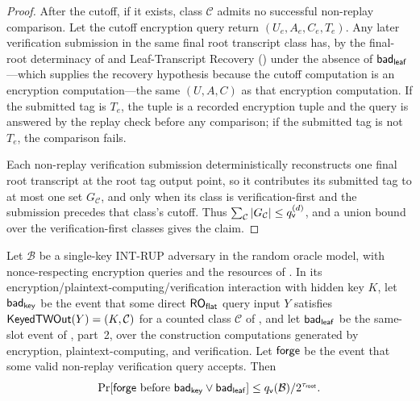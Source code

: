 \begin{proof}
After the cutoff, if it exists, class $\mathcal{C}$ admits no
successful non-replay comparison. Let the cutoff encryption query
return $(U_e,A_e,C_e,T_e)$. Any later verification submission in the
same final root transcript class has, by the final-root determinacy of
 and Leaf-Transcript Recovery
() under the absence of $\mathsf{bad}_{\mathsf{leaf}}$---which
supplies the recovery hypothesis because the cutoff computation is an
encryption computation---the same $(U,A,C)$ as that encryption
computation. If the submitted tag is $T_e$, the tuple is a recorded
encryption tuple and the query is answered by the replay check before
any comparison; if the submitted tag is not $T_e$, the comparison
fails.

Each non-replay verification submission deterministically reconstructs
one final root transcript at the root tag output point, so it
contributes its submitted tag to at most one set $G_{\mathcal{C}}$, and
only when its class is verification-first and the submission precedes
that class's cutoff. Thus
$\sum_{\mathcal{C}} |G_{\mathcal{C}}| \leq q_{\mathsf{v}}^{(d)}$, and a union
bound over the verification-first classes gives the claim.
\end{proof}

\begin{lemma}
\label{lem:int-rup-root-guess}
Let $\mathcal{B}$ be a single-key \textsf{INT-RUP} adversary in the
\TW{} random oracle model, with nonce-respecting encryption queries and
the resources of . In its
encryption/plaintext-computing/verification interaction with hidden key
$K$, let $\mathsf{bad}_{\mathsf{key}}$ be the event that some direct $\mathsf{RO}_{\mathsf{flat}}$ query input
$Y$ satisfies $\mathsf{KeyedTWOut}(Y) = (K,\mathcal{C})$ for a counted class
$\mathcal{C}$ of , and let $\mathsf{bad}_{\mathsf{leaf}}$ be the
same-slot event of , part~2, over the
construction computations generated by encryption, plaintext-computing,
and verification. Let $\mathsf{forge}$ be the event that some valid non-replay
verification query accepts. Then
\[
  \Pr[\mathsf{forge} \text{ before } \mathsf{bad}_{\mathsf{key}} \vee \mathsf{bad}_{\mathsf{leaf}}]
  \leq q_{\mathsf{v}}(\mathcal{B}) / 2^{\tau_{\mathsf{root}}}.
\]
\end{lemma}

